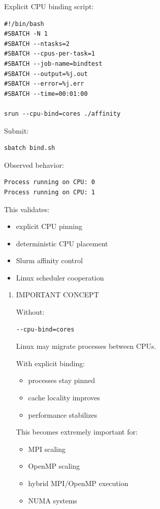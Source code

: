\documentclass[11pt]{article}
\begin{document}
Explicit CPU binding script:

\begin{verbatim}
#!/bin/bash
#SBATCH -N 1
#SBATCH --ntasks=2
#SBATCH --cpus-per-task=1
#SBATCH --job-name=bindtest
#SBATCH --output=%j.out
#SBATCH --error=%j.err
#SBATCH --time=00:01:00

srun --cpu-bind=cores ./affinity
\end{verbatim}

Submit:

\begin{verbatim}
sbatch bind.sh
\end{verbatim}

Observed behavior:

\begin{verbatim}
Process running on CPU: 0
Process running on CPU: 1
\end{verbatim}

This validates:

\begin{itemize}
\item explicit CPU pinning
\item deterministic CPU placement
\item Slurm affinity control
\item Linux scheduler cooperation
\end{itemize}
\begin{enumerate}
\item IMPORTANT CONCEPT
\label{sec:org30d2f41}

Without:

\begin{verbatim}
--cpu-bind=cores
\end{verbatim}

Linux may migrate processes between CPUs.

With explicit binding:

\begin{itemize}
\item processes stay pinned
\item cache locality improves
\item performance stabilizes
\end{itemize}

This becomes extremely important for:

\begin{itemize}
\item MPI scaling
\item OpenMP scaling
\item hybrid MPI/OpenMP execution
\item NUMA systems
\end{itemize}
\end{enumerate}
\end{document}
